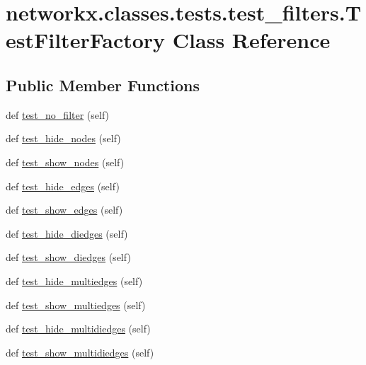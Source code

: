 \hypertarget{classnetworkx_1_1classes_1_1tests_1_1test__filters_1_1TestFilterFactory}{}\section{networkx.\+classes.\+tests.\+test\+\_\+filters.\+Test\+Filter\+Factory Class Reference}
\label{classnetworkx_1_1classes_1_1tests_1_1test__filters_1_1TestFilterFactory}
\subsection*{Public Member Functions}
\begin{DoxyCompactItemize}
\item 
def \hyperlink{classnetworkx_1_1classes_1_1tests_1_1test__filters_1_1TestFilterFactory_a50d91a4c49a2d3d4290af43346e8515f}{test\+\_\+no\+\_\+filter} (self)
\item 
def \hyperlink{classnetworkx_1_1classes_1_1tests_1_1test__filters_1_1TestFilterFactory_a15b192de641e4e99393e411115893125}{test\+\_\+hide\+\_\+nodes} (self)
\item 
def \hyperlink{classnetworkx_1_1classes_1_1tests_1_1test__filters_1_1TestFilterFactory_a6d984cc1be9fdc383136b4706b3d28cf}{test\+\_\+show\+\_\+nodes} (self)
\item 
def \hyperlink{classnetworkx_1_1classes_1_1tests_1_1test__filters_1_1TestFilterFactory_a8f351940f00e5e5bd52f3e30e8caa69c}{test\+\_\+hide\+\_\+edges} (self)
\item 
def \hyperlink{classnetworkx_1_1classes_1_1tests_1_1test__filters_1_1TestFilterFactory_aca0e2aac40acfcc6f6d0e4c7ce8fccea}{test\+\_\+show\+\_\+edges} (self)
\item 
def \hyperlink{classnetworkx_1_1classes_1_1tests_1_1test__filters_1_1TestFilterFactory_afe20c0c621db7b3172c313ddc7d70ac4}{test\+\_\+hide\+\_\+diedges} (self)
\item 
def \hyperlink{classnetworkx_1_1classes_1_1tests_1_1test__filters_1_1TestFilterFactory_ad1e1662e51b560d8c37e3ed3b31de10c}{test\+\_\+show\+\_\+diedges} (self)
\item 
def \hyperlink{classnetworkx_1_1classes_1_1tests_1_1test__filters_1_1TestFilterFactory_a9406db59060858a06d7f9aae64c8f8e7}{test\+\_\+hide\+\_\+multiedges} (self)
\item 
def \hyperlink{classnetworkx_1_1classes_1_1tests_1_1test__filters_1_1TestFilterFactory_ac0059dcd264e514ea483cdc35ca5c320}{test\+\_\+show\+\_\+multiedges} (self)
\item 
def \hyperlink{classnetworkx_1_1classes_1_1tests_1_1test__filters_1_1TestFilterFactory_af5b3b829ee8acfc94bf24212876efc3d}{test\+\_\+hide\+\_\+multidiedges} (self)
\item 
def \hyperlink{classnetworkx_1_1classes_1_1tests_1_1test__filters_1_1TestFilterFactory_aa73b3e148983cdac2dcd7360fe5d7e8d}{test\+\_\+show\+\_\+multidiedges} (self)
\end{DoxyCompactItemize}


